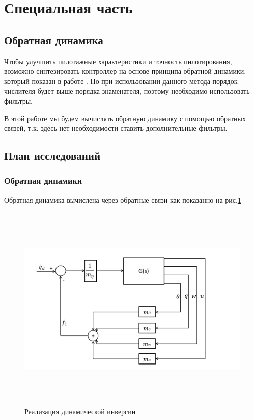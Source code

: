 \newpage
\section{Специальная часть}
\subsection{Обратная динамика}
\pagestyle{fancy}
\fancyhf{}
\rfoot{\thepage}

Чтобы улучшить пилотажные характеристики и точность пилотирования, возможно синтезировать контроллер на основе 
принципа обратной динамики, который показан в работе \cite{Zoe}. Но при использовании данного метода порядок числителя будет выше порядка знаменателя, поэтому необходимо использовать фильтры.

В этой работе мы будем вычислять обратную динамику с помощью обратных связей, т.к. здесь нет необходимости ставить дополнительные фильтры.

\subsection{План исследований}
\subsubsection{Обратная динамики }
Обратная динамика вычислена через обратные связи как показанно на рис.\ref{fig:САУ_ОД}
\begin{figure}[H]
    \centering \includegraphics[width=15cm,height=10cm]{Оглавление/Part3/figures/САУ_ОД.png}
    \caption{Реализация динамической инверсии}
    \label{fig:САУ_ОД}
    \end{figure}

